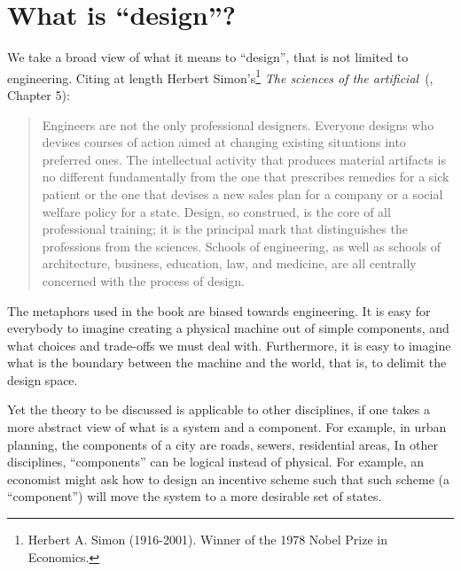 
\section{What is ``design''?}
\label{sec:design-what-is-design}


We take a broad view of what it means to ``design'', that is not limited to engineering.
Citing at length Herbert Simon's\footnote{Herbert A.
    Simon (1916-2001).
    Winner of the 1978 Nobel Prize in Economics.
}
\emph{The sciences of the artificial}~(\cite{hebert96sciences}, Chapter 5):

\begin{quote}
    Engineers are not the only professional designers.
    Everyone designs who devises courses of action aimed at changing existing situations into preferred ones.
    The intellectual activity that produces material artifacts is no different fundamentally from the one that prescribes remedies for a sick patient or the one that devises a new sales plan for a company or a social welfare policy for a state.
    Design, so construed, is the core of all professional training;
    it is the principal mark that distinguishes the professions from the sciences.
    Schools of engineering, as well as schools of architecture, business, education, law, and medicine, are all centrally concerned with the process of design.
\end{quote}

The metaphors used in the book are biased towards engineering.
It is easy for everybody to imagine creating a physical machine out of simple components, and what choices and trade-offs we must deal with.
Furthermore, it is easy to imagine what is the boundary between the machine and the world, that is, to delimit the design space.

Yet the theory to be discussed is applicable to other disciplines, if one takes a more abstract view of what is a system and a component.
For example, in urban planning, the components of a city are roads, sewers, residential areas, \etc
In other disciplines, ``components'' can be logical instead of physical.
For example, an economist might ask how to design an incentive scheme such that such scheme (a ``component'') will move the system to a more desirable set of states.
